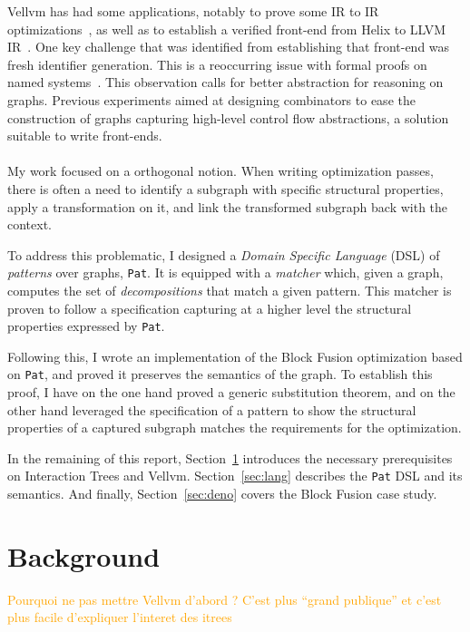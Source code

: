 \documentclass[11pt]{article}
\newcommand{\gr}[1]{\textcolor{Orange}{#1}}
\newcommand{\pat}{\texttt{Pat}\xspace}
\begin{document}
Vellvm has had some applications, notably to prove some IR to IR optimizations~\cite{?}, as well as to establish a verified front-end from Helix to LLVM IR~\cite{?}. One key challenge that was identified from establishing that front-end was fresh identifier generation. This is a reoccurring issue with formal proofs on named systems~\cite{?}. This observation calls for better abstraction for reasoning on graphs. Previous experiments aimed at designing combinators to ease the construction of graphs capturing high-level control flow abstractions, a solution suitable to write front-ends.

\paragraph{}
My work focused on a orthogonal notion. When writing optimization passes, there is often a need to identify a subgraph with specific structural properties, apply a transformation on it, and link the transformed subgraph back with the context.

To address this problematic, I designed a \emph{Domain Specific Language} (DSL) of \emph{patterns} over graphs, \pat{}. It is equipped with a \emph{matcher} which, given a graph, computes the set of \emph{decompositions} that match a given pattern. This matcher is proven to follow a specification capturing at a higher level the structural properties expressed by \pat{}.

Following this, I wrote an implementation of the Block Fusion optimization based on \pat{}, and proved it preserves the semantics of the graph. To establish this proof, I have on the one hand proved a generic substitution theorem, and on the other hand leveraged the specification of a pattern to show the structural properties of a captured subgraph matches the requirements for the optimization.

In the remaining of this report, Section~\ref{sec:background} introduces the necessary prerequisites on Interaction Trees and Vellvm. Section~\ref{sec:lang} describes the \pat{} DSL and its semantics. And finally, Section~\ref{sec:deno} covers the Block Fusion case study.

\section{Background}
\label{sec:background}

\gr{Pourquoi ne pas mettre Vellvm d'abord ? C'est plus ``grand publique'' et c'est plus facile d'expliquer l'interet des itrees}
\end{document}
